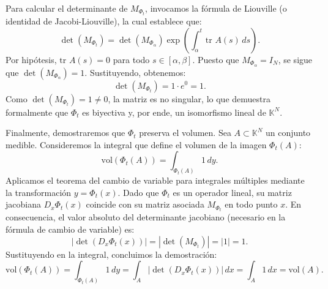 {    Para calcular el determinante de $M_{\Phi_t}$, invocamos la fórmula de Liouville (o identidad de Jacobi-Liouville), la cual establece que:
    \[
        \det(M_{\Phi_t}) = \det(M_{\Phi_\alpha}) \exp\left( \int_\alpha^t \text{tr } A(s) \, ds \right).
    \]
    Por hipótesis, $\text{tr } A(s) = 0$ para todo $s \in [\alpha, \beta]$. Puesto que $M_{\Phi_\alpha} = I_N$, se sigue que $\det(M_{\Phi_\alpha}) = 1$. Sustituyendo, obtenemos:
    \[
        \det(M_{\Phi_t}) = 1 \cdot e^0 = 1.
    \]
    Como $\det(M_{\Phi_t}) = 1 \neq 0$, la matriz es no singular, lo que demuestra formalmente que $\Phi_t$ es biyectiva y, por ende, un isomorfismo lineal de $\mathbb{K}^N$.

    Finalmente, demostraremos que $\Phi_t$ preserva el volumen. Sea $A \subset \mathbb{K}^N$ un conjunto medible. Consideremos la integral que define el volumen de la imagen $\Phi_t(A)$:
    \[
        \text{vol}(\Phi_t(A)) = \int_{\Phi_t(A)} 1 \, dy.
    \]
    Aplicamos el teorema del cambio de variable para integrales múltiples mediante la transformación $y = \Phi_t(x)$. Dado que $\Phi_t$ es un operador lineal, su matriz jacobiana $D_x\Phi_t(x)$ coincide con su matriz asociada $M_{\Phi_t}$ en todo punto $x$. En consecuencia, el valor absoluto del determinante jacobiano (necesario en la fórmula de cambio de variable) es:
    \[
        |\det(D_x\Phi_t(x))| = |\det(M_{\Phi_t})| = |1| = 1.
    \]
    Sustituyendo en la integral, concluimos la demostración:
    \[
        \text{vol}(\Phi_t(A)) = \int_{\Phi_t(A)} 1 \, dy = \int_A |\det(D_x\Phi_t(x))| \, dx = \int_A 1 \, dx = \text{vol}(A).
    \]
}






